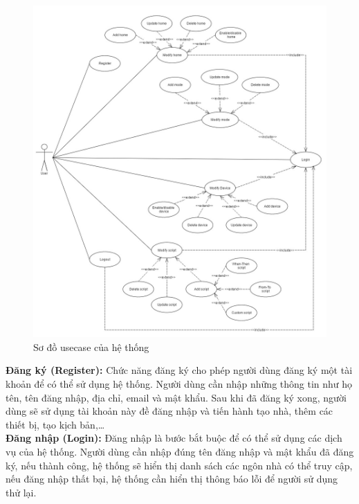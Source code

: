 \documentclass[12pt,a4paper,oneside]{extbook}
\begin{document}
\begin{figure}[h!]
  \centering
     \includegraphics[width=15.5cm]{2-Usecase}
  \caption{Sơ đồ usecase của hệ thống}\label{fig:2-Usecase}
\end{figure}

\noindent
\textbf{Đăng ký (Register):} Chức năng đăng ký cho phép người dùng đăng ký một tài khoản để có thể sử dụng hệ thống. Người dùng cần nhập những thông tin như họ tên, tên đăng nhập, địa chỉ, email và mật khẩu. Sau khi đã đăng ký xong, người dùng sẽ sử dụng tài khoản này đề đăng nhập và tiến hành tạo nhà, thêm các thiết bị, tạo kịch bản,\dots\\

\noindent
\textbf{Đăng nhập (Login):} Đăng nhập là bước bắt buộc để có thể sử dụng các dịch vụ của hệ thống. Người dùng cần nhập đúng tên đăng nhập và mật khẩu đã đăng ký, nếu thành công, hệ thống sẽ hiển thị danh sách các ngôn nhà có thể truy cập, nếu đăng nhập thất bại, hệ thống cần hiển thị thông báo lỗi để người sử dụng thử lại.\\
\end{document}
